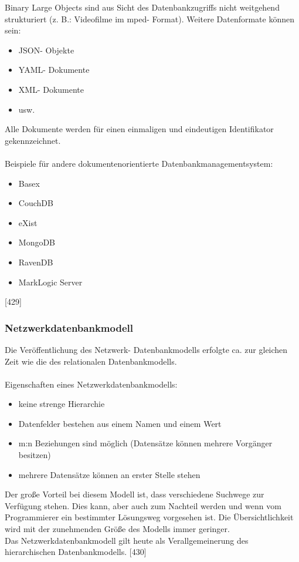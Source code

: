 \documentclass[12pt,a4paper]{report}
\begin{document}
\begin{onehalfspace}
Binary Large Objects sind aus Sicht des Datenbankzugriffs nicht weitgehend strukturiert (z. B.: Videofilme im mped- Format). Weitere Datenformate können sein:
\begin{itemize}
\item JSON- Objekte
\item YAML- Dokumente
\item XML- Dokumente
\item usw.
\end{itemize}
Alle Dokumente werden für einen einmaligen und eindeutigen Identifikator gekennzeichnet.\\
\\Beispiele für andere dokumentenorientierte Datenbankmanagementsystem:
\begin{itemize}
\item Basex
\item CouchDB
\item eXist
\item MongoDB
\item RavenDB
\item MarkLogic Server
\end{itemize}
[429]
\subsubsection{Netzwerkdatenbankmodell}
Die Veröffentlichung des Netzwerk- Datenbankmodells erfolgte ca. zur gleichen Zeit wie die des relationalen Datenbankmodells.\\
\\Eigenschaften eines Netzwerkdatenbankmodells:
\begin{itemize}
\item keine strenge Hierarchie
\item Datenfelder bestehen aus einem Namen und einem Wert
\item m:n Beziehungen sind möglich (Datensätze können mehrere Vorgänger besitzen)
\item mehrere Datensätze können an erster Stelle stehen
\end{itemize}
Der große Vorteil bei diesem Modell ist, dass verschiedene Suchwege zur Verfügung stehen. Dies kann, aber auch zum Nachteil werden und wenn vom Programmierer ein bestimmter Lösungsweg vorgesehen ist. Die Übersichtlichkeit wird mit der zunehmenden Größe des Modells immer geringer.\\

Das Netzwerkdatenbankmodell gilt heute als Verallgemeinerung des hierarchischen Datenbankmodells. [430]


\end{onehalfspace}
\end{document}
